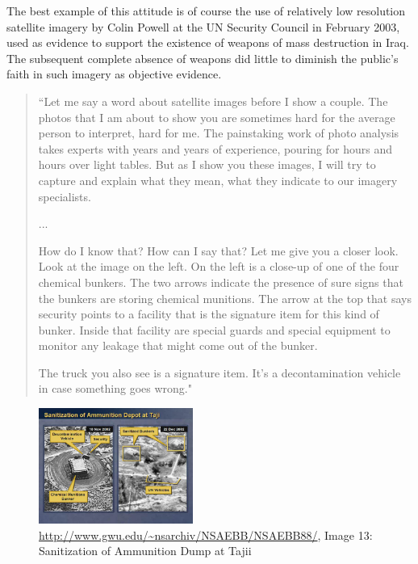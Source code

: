 \documentclass[11pt]{report}
\begin{document}
The best example of this attitude is of course the use of relatively low resolution satellite imagery by Colin Powell at the UN Security Council in February 2003, used as evidence to support the existence of weapons of mass destruction in Iraq. The subsequent complete absence of weapons did little to diminish the public's faith in such imagery as objective evidence. 

\begin{quote}
``Let me say a word about satellite images before I show a couple. The photos that I am about to show you are sometimes hard for the average person to interpret, hard for me. The painstaking work of photo analysis takes experts with years and years of experience, pouring for hours and hours over light tables. But as I show you these images, I will try to capture and explain what they mean, what they indicate to our imagery specialists.

...

How do I know that? How can I say that? Let me give you a closer look. Look at the image on the left. On the left is a close-up of one of the four chemical bunkers. The two arrows indicate the presence of sure signs that the bunkers are storing chemical munitions. The arrow at the top that says security points to a facility that is the signature item for this kind of bunker. Inside that facility are special guards and special equipment to monitor any leakage that might come out of the bunker.

The truck you also see is a signature item. It's a decontamination vehicle in case something goes wrong."
	\cite{guardian2003powell}
\end{quote}

\begin{figure}
	\begin{flushright}
		\includegraphics[width=0.45\textwidth]{images/iraq-image-13.jpg}
		\url{http://www.gwu.edu/~nsarchiv/NSAEBB/NSAEBB88/}, Image 13: Sanitization of Ammunition Dump at Tajii	
	\end{flushright}
\end{figure}
\end{document}
